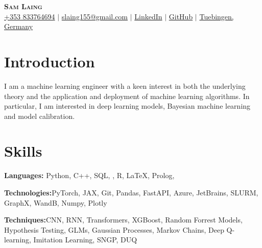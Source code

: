 \documentclass[letterpaper,11pt]{article}
\newcommand{\resumeSubHeadingListStart}{\begin{itemize}[leftmargin=0.15in, label={}]}
\newcommand{\resumeSubHeadingListEnd}{\end{itemize}}
\begin{document}

\begin{center}
    \textbf{\Huge \scshape Sam Laing} \\ \vspace{3pt}
    \small
    \faMobile \hspace{.5pt} \href{tel:353833764694}{+353 833764694}
    $|$
    \faAt \hspace{.5pt} \href{slaing155@gmail.com}{slaing155@gmail.com}
    $|$
    \faLinkedinSquare \hspace{.5pt} \href{https://www.linkedin.com/in/sam-laing-196403214}{LinkedIn}
    $|$
    \faGithub \hspace{.5pt} \href{https://github.com/sam-laing}{GitHub}
    $|$
    \faMapMarker \hspace{.5pt} \href{https://maps.app.goo.gl/zDdAp6SFpdj8fM548}{Tuebingen, Germany}
\end{center}

\section{Introduction}
 I am a machine learning engineer with a keen interest in both the underlying theory and the application and deployment of machine learning algorithms. In particular, I am interested in deep learning models, Bayesian machine learning and model calibration.

\section{Skills}
  \vspace{2pt}
  \resumeSubHeadingListStart
    \small{\item{
        
        \textbf{Languages:}{ Python, C++, SQL, , R, \LaTeX, Prolog, } \\ \vspace{3pt}
        
        \textbf{Technologies:}{PyTorch, JAX, Git, Pandas, FastAPI, Azure, JetBrains, SLURM, GraphX, WandB, Numpy, Plotly} \\ \vspace{3pt}
        
	\textbf{Techniques:}{CNN, RNN, Transformers, XGBoost, Random Forrest Models, Hypothesis Testing, GLMs, Gaussian Processes, Markov Chains, Deep Q-learning, Imitation Learning, SNGP, DUQ }
        
    }}
  \resumeSubHeadingListEnd
\end{document}
